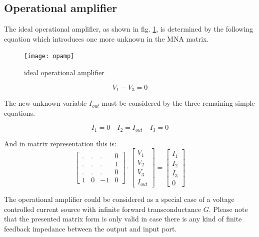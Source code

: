 \documentclass[10pt]{report}
\begin{document}
\subsection{Operational amplifier}

The ideal operational amplifier, as shown in fig. \ref{fig:opamp}, is
determined by the following equation which introduces one more unknown
in the MNA matrix.

\begin{figure}[ht]
\begin{center}
\texttt{[image: opamp]}
\end{center}
\caption{ideal operational amplifier}
\label{fig:opamp}
\end{figure}
\FloatBarrier

\begin{equation}
V_{1} - V_{3} = 0
\label{eq:opamp}
\end{equation}

The new unknown variable $I_{out}$ must be considered by the three
remaining simple equations.

\begin{equation}
I_{1} = 0 \quad I_{2} = I_{out} \quad I_{3} = 0
\end{equation}

And in matrix representation this is:
\begin{equation}
\begin{bmatrix}
.&.&.& 0\\
.&.&.& 1\\
.&.&.& 0\\
1 & 0 & -1 & 0
\end{bmatrix}
\cdot
\begin{bmatrix}
V_{1}\\
V_{2}\\
V_{3}\\
I_{out}
\end{bmatrix}
=
\begin{bmatrix}
I_{1}\\
I_{2}\\
I_{3}\\
0
\end{bmatrix}
\end{equation}

The operational amplifier could be considered as a special case of a
voltage controlled current source with infinite forward
transconductance $G$.  Please note that the presented matrix form is
only valid in case there is any kind of finite feedback impedance
between the output and input port.
\end{document}

